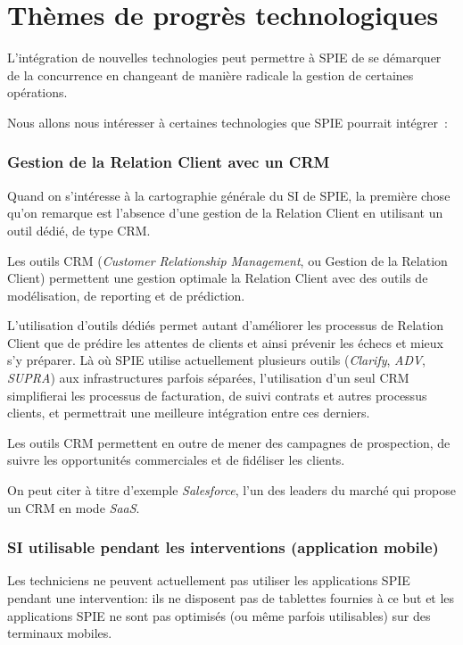 \section{Thèmes de progrès technologiques}
\label{progres_tech}

    L'intégration de nouvelles technologies peut permettre à SPIE de se démarquer de la concurrence en changeant de manière radicale la gestion de certaines opérations.

    Nous allons nous intéresser à certaines technologies que SPIE pourrait intégrer~:

        \subsubsection{Gestion de la Relation Client avec un CRM}

            Quand on s'intéresse à la cartographie générale du SI de SPIE, la première chose qu'on remarque est l'absence d'une gestion de la Relation Client en utilisant un outil dédié, de type CRM.

            Les outils CRM (\textit{Customer Relationship Management}, ou Gestion de la Relation Client) permettent une gestion optimale la Relation Client avec des outils de modélisation, de reporting et de prédiction.

            L'utilisation d'outils dédiés permet autant d'améliorer les processus de Relation Client que de prédire les attentes de clients et ainsi prévenir les échecs et mieux s'y préparer. Là où SPIE utilise actuellement plusieurs outils (\textit{Clarify}, \textit{ADV}, \textit{SUPRA}) aux infrastructures parfois séparées, l'utilisation d'un seul CRM simplifierai les processus de facturation, de suivi contrats et autres processus clients, et permettrait une meilleure intégration entre ces derniers.

            Les outils CRM permettent en outre de mener des campagnes de prospection, de suivre les opportunités commerciales et de fidéliser les clients.

            On peut citer à titre d'exemple \textit{Salesforce}, l'un des leaders du marché qui propose un CRM en mode \textit{SaaS}.

        \subsubsection{SI utilisable pendant les interventions (application mobile)}

            Les techniciens ne peuvent actuellement pas utiliser les applications SPIE pendant une intervention: ils ne disposent pas de tablettes fournies à ce but et les applications SPIE ne sont pas optimisés (ou même parfois utilisables) sur des terminaux mobiles.

